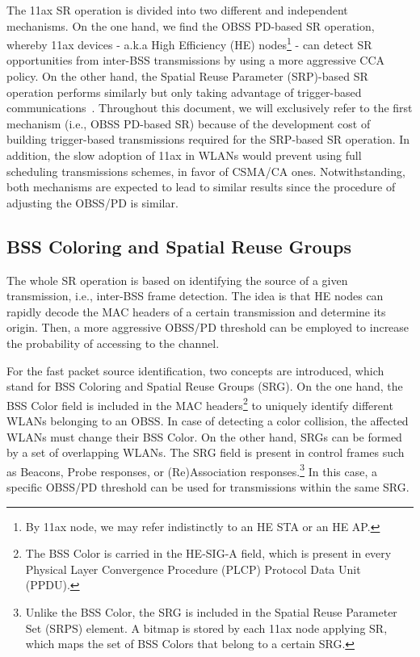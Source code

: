 \documentclass[conference]{IEEEtran}
\begin{document}
	The 11ax SR operation is divided into two different and independent mechanisms. On the one hand, we find the OBSS PD-based SR operation, whereby 11ax devices - a.k.a High Efficiency (HE) nodes\footnote{By 11ax node, we may refer indistinctly to an HE STA or an HE AP.} - can detect SR opportunities from inter-BSS transmissions by using a more aggressive CCA policy. On the other hand, the Spatial Reuse Parameter (SRP)-based SR operation performs similarly but only taking advantage of trigger-based communications~\cite{bellalta2019ap}. Throughout this document, we will exclusively refer to the first mechanism (i.e., OBSS PD-based SR) because of the development cost of building trigger-based transmissions required for the SRP-based SR operation. In addition, the slow adoption of 11ax in WLANs would prevent using full scheduling transmissions schemes, in favor of CSMA/CA ones. Notwithstanding, both mechanisms are expected to lead to similar results since the procedure of adjusting the OBSS/PD is similar.
	
	\subsection{BSS Coloring and Spatial Reuse Groups}
	
	The whole SR operation is based on identifying the source of a given transmission, i.e., inter-BSS frame detection. The idea is that HE nodes can rapidly decode the MAC headers of a certain transmission and determine its origin. Then, a more aggressive OBSS/PD threshold can be employed to increase the probability of accessing to the channel.
	
	For the fast packet source identification, two concepts are introduced, which stand for BSS Coloring and Spatial Reuse Groups (SRG). On the one hand, the BSS Color field is included in the MAC headers\footnote{The BSS Color is carried in the HE-SIG-A field, which is present in every Physical Layer Convergence Procedure (PLCP) Protocol Data Unit (PPDU).} to uniquely identify different WLANs belonging to an OBSS. In case of detecting a color collision, the affected WLANs must change their BSS Color. On the other hand, SRGs can be formed by a set of overlapping WLANs. The SRG field is present in control frames such as Beacons, Probe responses, or (Re)Association responses.\footnote{Unlike the BSS Color, the SRG is included in the Spatial Reuse Parameter Set (SRPS) element. A bitmap is stored by each 11ax node applying SR, which maps the set of BSS Colors that belong to a certain SRG.} In this case, a specific OBSS/PD threshold can be used for transmissions within the same SRG.
		
\end{document}
